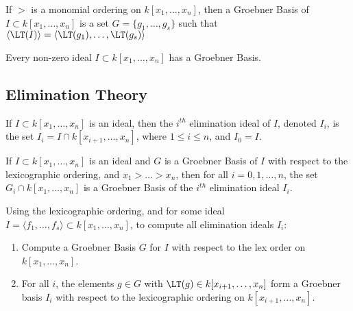 \documentclass[crop=false,class=article,oneside]{standalone}
\begin{document}
        \begin{definition}
            If $>$ is a monomial ordering on $k[x_{1},\hdots,x_{n}]$,
            then a Groebner Basis of $I\subset k[x_{1},\hdots,x_{n}]$
            is a set $G=\{g_{1},\hdots,g_{s}\}$ such that
            $\langle\LT(I)\rangle%
             =\langle \LT(g_1),\hdots,\LT(g_s)\rangle$
        \end{definition}
        \begin{theorem}
            Every non-zero ideal
            $I\subset{k}[x_{1},\hdots,x_{n}]$
            has a Groebner Basis.
        \end{theorem}
    \subsection{Elimination Theory}
        \begin{definition}
            If $I\subset{k}[x_1,\hdots,x_{n}]$ is an ideal,
            then the $i^{th}$ elimination ideal of $I$,
            denoted $I_{i}$, is the set
            $I_{i}=I\cap{k}[x_{i+1},\hdots,x_{n}]$,
            where $1\leq{i}\leq{n}$, and $I_{0}=I$.
        \end{definition}
        \begin{theorem}
            If $I\subset k[x_1,\hdots ,x_n]$ is an ideal and
            $G$ is a Groebner Basis of $I$ with respect to the
            lexicographic ordering, and $x_1>\hdots > x_n$, then
            for all $i=0,1,\hdots,n$, the set
            $G_{i}\cap{k}[x_1,\hdots,x_n]$ is a Groebner Basis of
            the $i^{th}$ elimination ideal $I_{i}$.
        \end{theorem}
        \begin{remark}
            Using the lexicographic ordering, and for some ideal
            $I=\langle{f_{1}},\hdots,f_{s}\rangle%
               \subset{k}[x_1,\hdots ,x_n]$,
            to compute all elimination ideals $I_{i}$:
            \begin{enumerate}
                \item Compute a Groebner Basis $G$ for $I$ with
                      respect to the lex order on $k[x_1,\hdots,x_n]$.
                \item For all $i$, the elements $g\in G$ with
                      $\LT(g)\in{k}[x_{i+1},\hdots,x_{n}]$ form a
                      Groebner basis $I_{i}$ with respect to
                      the lexicographic ordering on
                      $k[x_{i+1},\hdots,x_n]$.
            \end{enumerate}
        \end{remark}
\end{document}
